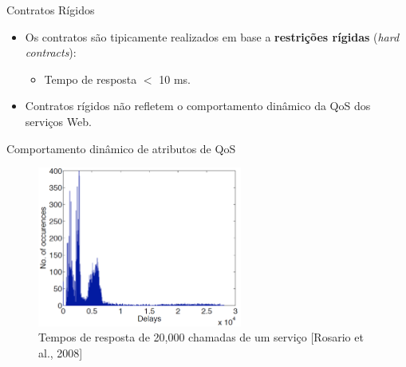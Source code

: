 \documentclass[xcolor=svgnames]{beamer}
\begin{document}
    \begin{frame}{Contratos Rígidos}
        \begin{itemize}
          \item <1-> Os contratos são tipicamente realizados em base a \textbf{restrições rígidas} (\emph{hard contracts}):
                \begin{itemize}
		  \item <2-> Tempo de resposta $<$ 10 ms.
                \end{itemize}
          \item <3->Contratos rígidos não refletem o comportamento dinâmico da QoS dos serviços Web.
        \end{itemize}
    \end{frame}


    \begin{frame}{Comportamento dinâmico de atributos de QoS}
      \begin{figure}[!h]
          \centering
          \includegraphics[width=0.6\textwidth]{hardContractsLimitations.png}
          \caption{Tempos de resposta de 20,000 chamadas de um serviço [Rosario et al., 2008] } %
      \end{figure}	

      \tiny{
      }
    \end{frame}
\end{document}
